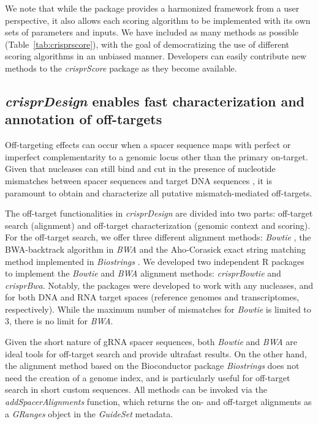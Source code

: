 \documentclass[pdftex,english,10pt]{article}
\begin{document}
We note that while the package provides a harmonized framework from a user perspective, it also allows each scoring algorithm to be implemented with its own sets of parameters and inputs. We have included as many methods as possible (Table~\ref{tab:crisprscore}), with the goal of democratizing the use of different scoring algorithms in an unbiased manner. Developers can easily contribute new methods to the \textit{crisprScore} package as they become available. 


\subsection*{\textit{crisprDesign} enables fast characterization and annotation of off-targets}

Off-targeting effects can occur when a spacer sequence maps with
perfect or imperfect complementarity to a genomic locus other than the primary on-target.
Given that nucleases can still bind and cut in the presence of nucleotide mismatches between spacer sequences and target DNA sequences \citep{offtarget1,offtarget2,offtarget3}, it is paramount to obtain and characterize all putative mismatch-mediated off-targets.

The off-target functionalities in \textit{crisprDesign} are divided into two parts: off-target search (alignment) and off-target characterization (genomic context and scoring). For the off-target search, we offer three different alignment methods: \textit{Bowtie} \citep{bowtie}, the BWA-backtrack algorithm in \textit{BWA} \citep{bwa} and the Aho-Corasick exact string matching method implemented in \textit{Biostrings} \citep{aho1975efficient,pages2016biostrings}. 
We developed two independent R packages to implement the \textit{Bowtie} and \textit{BWA} alignment methods: \textit{crisprBowtie} and \textit{crisprBwa}. 
Notably, the packages were developed to work with any nucleases, and for both DNA and RNA target spaces (reference genomes and transcriptomes, respectively). 
While the maximum number of mismatches for \textit{Bowtie} is limited to 3, there is no limit for \textit{BWA}. 

Given the short nature of gRNA spacer sequences, both \textit{Bowtie} and \textit{BWA} are ideal tools for off-target search and provide ultrafast results.
On the other hand, the alignment method based on the Bioconductor package \textit{Biostrings} does not need the creation of a genome index, and is particularly useful for off-target search in short custom sequences. All methods can be invoked via the \textit{addSpacerAlignments} function, which returns the on- and off-target alignments as a \textit{GRanges} object in the \textit{GuideSet} metadata.
\end{document}
